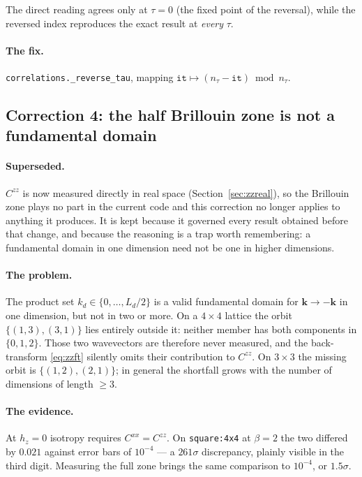 \documentclass[11pt,a4paper]{article}
\newcommand{\code}[1]{\texttt{#1}}
\begin{document}
The direct reading agrees only at $\tau=0$ (the fixed point of the reversal),
while the reversed index reproduces the exact result at \emph{every} $\tau$.

\paragraph{The fix.} \code{correlations.\_reverse\_tau}, mapping
$\code{it}\mapsto(n_\tau-\code{it})\bmod n_\tau$.

\subsection{Correction 4: the half Brillouin zone is not a fundamental domain}
\label{sec:corr4}

\paragraph{Superseded.} $C^{zz}$ is now measured directly in real space
(Section~\ref{sec:zzreal}), so the Brillouin zone plays no part in the current
code and this correction no longer applies to anything it produces. It is kept
because it governed every result obtained before that change, and because the
reasoning is a trap worth remembering: a fundamental domain in one dimension
need not be one in higher dimensions.

\paragraph{The problem.} The product set $k_d\in\{0,\dots,L_d/2\}$ is a valid
fundamental domain for $\mathbf{k}\to-\mathbf{k}$ in one dimension, but not in
two or more. On a $4\times4$ lattice the orbit $\{(1,3),(3,1)\}$ lies entirely
outside it: neither member has both components in $\{0,1,2\}$. Those two
wavevectors are therefore never measured, and the back-transform
\eqref{eq:zzft} silently omits their contribution to $C^{zz}$. On $3\times3$ the
missing orbit is $\{(1,2),(2,1)\}$; in general the shortfall grows with the
number of dimensions of length $\geq3$.

\paragraph{The evidence.} At $h_z=0$ isotropy requires $C^{xx}=C^{zz}$. On
\code{square:4x4} at $\beta=2$ the two differed by $0.021$ against error bars of
$10^{-4}$ --- a $261\sigma$ discrepancy, plainly visible in the third digit.
Measuring the full zone brings the same comparison to $10^{-4}$, or
$1.5\sigma$.
\end{document}
